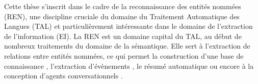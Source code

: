 \documentclass[PhD-Yoann-Dupont.tex]{subfiles}
\begin{document}
Cette thèse s'inscrit dans le cadre de la reconnaissance des entités nommées (REN), une discipline cruciale du domaine du Traitement Automatique des Langues (TAL) et particulièrement intéressante dans le domaine de l'extraction de l'information (EI). La REN est un domaine capital du TAL, au début de nombreux traitements du domaine de la sémantique. Elle sert à l'extraction de relations entre entités nommées, ce qui permet la construction d'une base de connaissance \citep{surdeanu2014overview,rahman2017tac}, l'extraction d'évènements \citep{kumaran2004text}, le résumé automatique \citep{nobata2002summarization,spitz2016terms} ou encore à la conception d'agents conversationnels \citep{cahn2017chatbot}.
\end{document}
